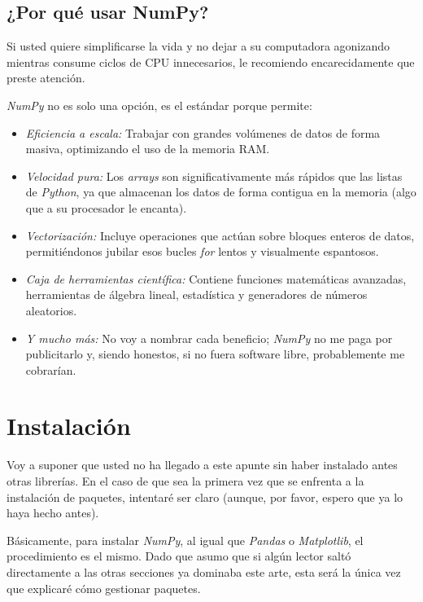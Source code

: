 \subsection{¿Por qué usar NumPy?}

Si usted quiere simplificarse la vida y no dejar a su computadora agonizando mientras consume ciclos de CPU innecesarios, le recomiendo encarecidamente que preste atención.

\textit{NumPy} no es solo una opción, es el estándar porque permite:

\begin{itemize}
    \item \textit{Eficiencia a escala:} Trabajar con grandes volúmenes de datos de forma masiva, optimizando el uso de la memoria RAM.
    \item \textit{Velocidad pura:} Los \textit{arrays} son significativamente más rápidos que las listas de \textit{Python}, ya que almacenan los datos de forma contigua en la memoria (algo que a su procesador le encanta).
    \item \textit{Vectorización:} Incluye operaciones que actúan sobre bloques enteros de datos, permitiéndonos jubilar esos bucles \textit{for} lentos y visualmente espantosos.
    \item \textit{Caja de herramientas científica:} Contiene funciones matemáticas avanzadas, herramientas de álgebra lineal, estadística y generadores de números aleatorios.
    \item \textit{Y mucho más:} No voy a nombrar cada beneficio; \textit{NumPy} no me paga por publicitarlo y, siendo honestos, si no fuera software libre, probablemente me cobrarían.
\end{itemize}


\section{Instalación}

Voy a suponer que usted no ha llegado a este apunte sin haber instalado antes otras librerías. En el caso de que sea la primera vez que se enfrenta a la instalación de paquetes, intentaré ser claro (aunque, por favor, espero que ya lo haya hecho antes).

Básicamente, para instalar \textit{NumPy}, al igual que \textit{Pandas} o \textit{Matplotlib}, el procedimiento es el mismo. Dado que asumo que si algún lector saltó directamente a las otras secciones ya dominaba este arte, esta será la única vez que explicaré cómo gestionar paquetes.

